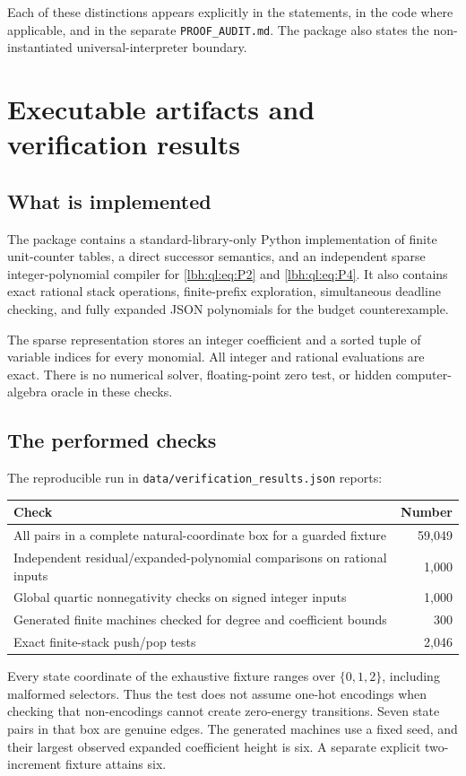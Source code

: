 \documentclass[11pt,letterpaper]{article}
\theoremstyle{definition}
\theoremstyle{remark}
\newcommand{\code}[1]{\texttt{#1}}
\newcommand{\1}{\mathbf 1}
\newcommand{\srctag}[1]{\texorpdfstring{\hspace{0.4em}{\normalfont\small\color{accent}[source #1]}}{ [source #1]}}
\begin{document}
Each of these distinctions appears explicitly in the statements, in the
code where applicable, and in the separate \texttt{PROOF\_AUDIT.md}. The
package also states the non-instantiated universal-interpreter boundary.
\section{Executable artifacts and verification results\srctag{11}}\label{lbh:ql:sec:verification}

\subsection{What is implemented}
The package contains a standard-library-only Python implementation of finite
unit-counter tables, a direct successor semantics, and an independent sparse
integer-polynomial compiler for \eqref{lbh:ql:eq:P2} and \eqref{lbh:ql:eq:P4}. It also
contains exact rational stack operations, finite-prefix exploration,
simultaneous deadline checking, and fully expanded JSON polynomials for the
budget counterexample.

The sparse representation stores an integer coefficient and a sorted tuple
of variable indices for every monomial. All integer and rational evaluations
are exact. There is no numerical solver, floating-point zero test, or hidden
computer-algebra oracle in these checks.

\subsection{The performed checks}
The reproducible run in \code{data/verification\_results.json} reports:
\begin{center}
\begin{tabularx}{\textwidth}{@{}Xr@{}}
\toprule
Check & Number\\
\midrule
All pairs in a complete natural-coordinate box for a guarded fixture & 59,049\\
Independent residual/expanded-polynomial comparisons on rational inputs & 1,000\\
Global quartic nonnegativity checks on signed integer inputs & 1,000\\
Generated finite machines checked for degree and coefficient bounds & 300\\
Exact finite-stack push/pop tests & 2,046\\
\bottomrule
\end{tabularx}
\end{center}
Every state coordinate of the exhaustive fixture ranges over $\{0,1,2\}$,
including malformed selectors. Thus the test does not assume one-hot encodings
when checking that non-encodings cannot create zero-energy transitions. Seven
state pairs in that box are genuine edges. The generated machines use a fixed
seed, and their largest observed expanded coefficient height is six. A
separate explicit two-increment fixture attains six.
\end{document}
